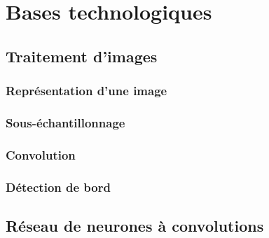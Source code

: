 \chapter{Bases technologiques}

\section{Traitement d'images}
\subsection{Représentation d'une image}\label{techno.traitement.repr}

\subsection{Sous-échantillonnage}
\subsection{Convolution}\label{techno.traitement.convolution}
\subsection{Détection de bord}

\section{Réseau de neurones à convolutions}

